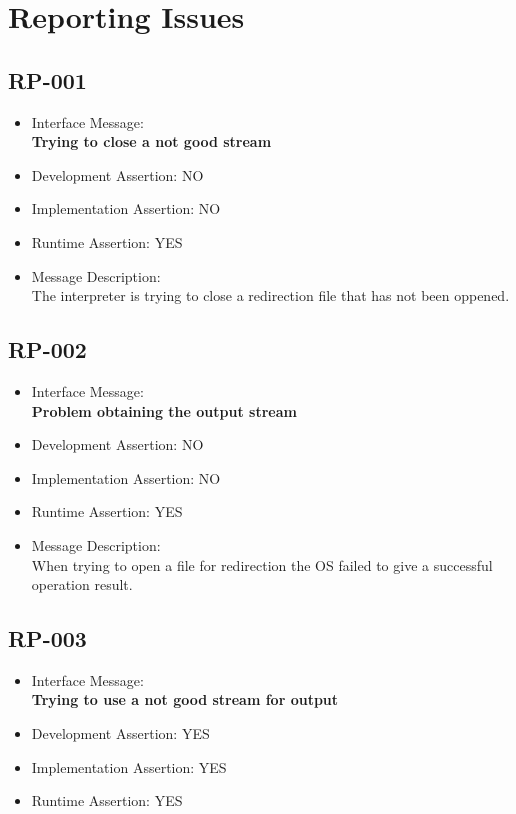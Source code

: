\section{Reporting Issues}

\subsection{RP-001}
\begin{itemize}
  \item Interface Message:\\[1em]
    \textbf{Trying to close a not good stream}
  \item Development Assertion: NO
  \item Implementation Assertion: NO
  \item Runtime Assertion: YES
  \item Message Description:\\[1em]
    The interpreter is trying to close a redirection file that has not been oppened.
\end{itemize}

\subsection{RP-002}
\begin{itemize}
  \item Interface Message:\\[1em]
    \textbf{Problem obtaining the output stream}
  \item Development Assertion: NO
  \item Implementation Assertion: NO
  \item Runtime Assertion: YES
  \item Message Description:\\[1em]
    When trying to open a file for redirection the OS failed to give a successful operation result.
\end{itemize}

\subsection{RP-003}
\begin{itemize}
  \item Interface Message:\\[1em]
    \textbf{Trying to use a not good stream for output}
  \item Development Assertion: YES
  \item Implementation Assertion: YES
  \item Runtime Assertion: YES
\end{itemize}


